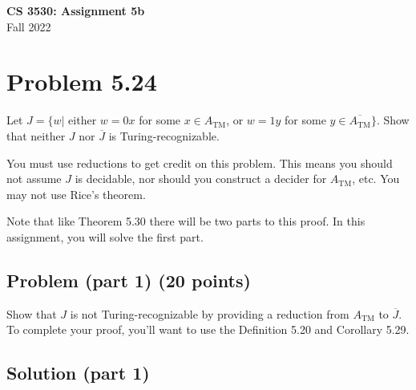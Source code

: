 \documentclass{article}
\begin{document}
\begin{center}
\textbf{\Large CS 3530: Assignment 5b} \\[2mm]
Fall 2022
\end{center}

\raggedright

\section*{Problem 5.24}

Let $J = \{ w | $ either $w = 0x$ for some $x \in A_\text{TM}$, or $w = 1y$ for some $y \in \overline{A_\text{TM}} \}$.
Show that neither $J$ nor $\overline{J}$ is Turing-recognizable.

You must use reductions to get credit on this problem. This
means you should not assume $J$ is decidable, nor should you
construct a decider for $A_\text{TM}$, etc. You may not use Rice's
theorem.

Note that like Theorem 5.30 there will be two parts to this proof.  In this assignment, you will solve the first part.

\subsection*{Problem (part 1) (20 points)}

Show that $J$ is not Turing-recognizable by providing a reduction from $A_\text{TM}$ to $\overline{J}$.  To complete your proof, you'll want to use the Definition 5.20 and Corollary 5.29.

\subsection*{Solution (part 1)}
\end{document}

